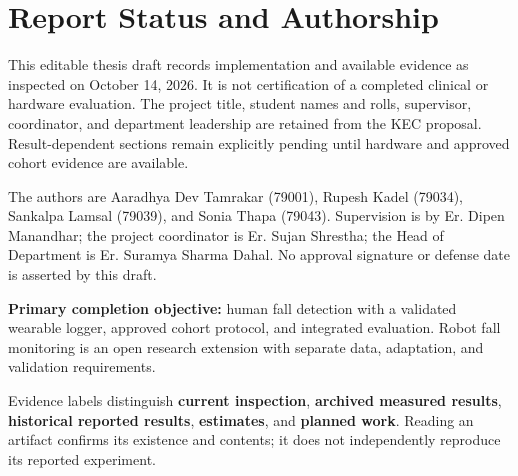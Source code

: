 \chapter*{Report Status and Authorship}
This editable thesis draft records implementation and available evidence as inspected on October 14, 2026. It is not certification of a completed clinical or hardware evaluation. The project title, student names and rolls, supervisor, coordinator, and department leadership are retained from the KEC proposal. Result-dependent sections remain explicitly pending until hardware and approved cohort evidence are available.

The authors are Aaradhya Dev Tamrakar (79001), Rupesh Kadel (79034), Sankalpa Lamsal (79039), and Sonia Thapa (79043). Supervision is by Er. Dipen Manandhar; the project coordinator is Er. Sujan Shrestha; the Head of Department is Er. Suramya Sharma Dahal. No approval signature or defense date is asserted by this draft.

\textbf{Primary completion objective:} human fall detection with a validated wearable logger, approved cohort protocol, and integrated evaluation. Robot fall monitoring is an open research extension with separate data, adaptation, and validation requirements.

Evidence labels distinguish \textbf{current inspection}, \textbf{archived measured results}, \textbf{historical reported results}, \textbf{estimates}, and \textbf{planned work}. Reading an artifact confirms its existence and contents; it does not independently reproduce its reported experiment.
